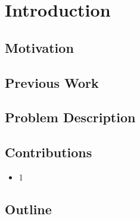 
\chapter{Introduction}


\section{Motivation}


\section{Previous Work}

\section{Problem Description}


\section{Contributions}

\begin{itemize}
    \item 1
\end{itemize}


\section{Outline}
